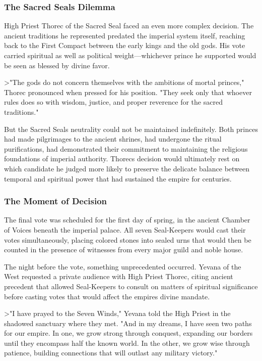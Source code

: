 \subsubsection{The Sacred Seal\textquotesingle s
Dilemma}\label{the-sacred-seals-dilemma}

High Priest Thorec of the Sacred Seal faced an even more complex
decision. The ancient traditions he represented predated the imperial
system itself, reaching back to the First Compact between the early
kings and the old gods. His vote carried spiritual as well as political
weight---whichever prince he supported would be seen as blessed by
divine favor.

\textgreater"The gods do not concern themselves with the ambitions of
mortal princes," Thorec pronounced when pressed for his position. "They
seek only that whoever rules does so with wisdom, justice, and proper
reverence for the sacred traditions."

But the Sacred Seal\textquotesingle s neutrality could not be maintained
indefinitely. Both princes had made pilgrimages to the ancient shrines,
had undergone the ritual purifications, had demonstrated their
commitment to maintaining the religious foundations of imperial
authority. Thorec\textquotesingle s decision would ultimately rest on
which candidate he judged more likely to preserve the delicate balance
between temporal and spiritual power that had sustained the empire for
centuries.

\subsubsection{The Moment of Decision}\label{the-moment-of-decision}

The final vote was scheduled for the first day of spring, in the ancient
Chamber of Voices beneath the imperial palace. All seven Seal-Keepers
would cast their votes simultaneously, placing colored stones into
sealed urns that would then be counted in the presence of witnesses from
every major guild and noble house.

The night before the vote, something unprecedented occurred. Yevana of
the West requested a private audience with High Priest Thorec, citing
ancient precedent that allowed Seal-Keepers to consult on matters of
spiritual significance before casting votes that would affect the
empire\textquotesingle s divine mandate.

\textgreater"I have prayed to the Seven Winds," Yevana told the High
Priest in the shadowed sanctuary where they met. "And in my dreams, I
have seen two paths for our empire. In one, we grow strong through
conquest, expanding our borders until they encompass half the known
world. In the other, we grow wise through patience, building connections
that will outlast any military victory."

